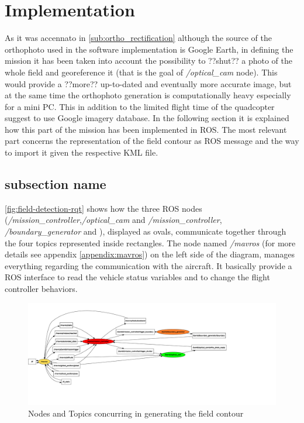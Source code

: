 \section{Implementation} %
\label{sec:implementation}
As it was accennato in \ref{sub:ortho_rectification} although the source of the orthophoto used in the software implementation is Google Earth, in defining the mission it has been taken into account the possibility to ??shut?? a photo of the whole field and georeference it (that is the goal of \textit{/optical\_cam} node). This would provide a ??more?? up-to-dated and eventually more accurate image, but at the same time the orthophoto generation is computationally heavy especially for a mini PC. This in addition to the limited flight time of the quadcopter suggest to use Google imagery database.
In the following section it is explained how this part of the mission has been implemented in ROS. The most relevant part concerns the representation of the field contour as ROS message and the way to import it given the respective KML file.

\subsection{subsection name} %
\label{sub:subsubsection_name}
\autoref{fig:field-detection-rqt} shows how the three ROS nodes (\textit{/mission\_controller},\textit{/optical\_cam} and \textit{/mission\_controller}, \textit{/boundary\_generator} and ), displayed as ovals, communicate together through the four topics represented inside rectangles. The node named \textit{/mavros} (for more details see appendix \ref{appendix:mavros}) on the left side of the diagram, manages everything regarding the communication with the aircraft. It basically provide a ROS interface to read the vehicle status variables and to change the flight controller behaviors.
\begin{figure}[ht]
    \centering
    \includegraphics[width=1.3\textwidth]{figures/C2/fieldDetection-rqt_graph.pdf}
    \caption{Nodes and Topics concurring in generating the field contour}
    \label{fig:field-detection-rqt}
\end{figure}


